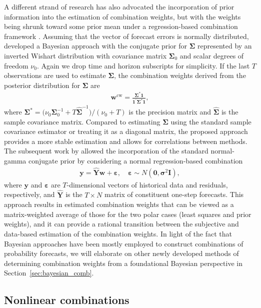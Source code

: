\documentclass[a4paper,11pt]{article}
\begin{document}
A different strand of research has also advocated the incorporation of prior information into the estimation of combination weights, but with the weights being shrunk toward some prior mean under a regression-based combination framework \citep{Newbold2002-wa}. Assuming that the vector of forecast errors is normally distributed, \citet{Clemen1986-pd} developed a Bayesian approach with the conjugate prior for $\bm{\Sigma}$ represented by an inverted Wishart distribution with covariance matrix $\bm{\Sigma}_{0}$ and scalar degrees of freedom $\nu_{0}$. Again we drop time and horizon subscripts for simplicity. If the last $T$ observations are used to estimate $\bm{\Sigma}$, the combination weights derived from the posterior distribution for $\bm{\Sigma}$ are
\begin{align*}
  \bm{w}^{\text{cw}}=\frac{\bm{\Sigma}^{*}\bm{1}}{\bm{1}^{\prime} \bm{\Sigma}^{*} \bm{1}},
\end{align*}
where $\bm{\Sigma}^{*}=\big(\nu_{0} \bm{\Sigma}_{0}^{-1}+T \hat{\bm{\Sigma}}^{-1}\big) /(\nu_{0}+T)$ is the precision matrix and $\hat{\bm{\Sigma}}$ is the sample covariance matrix.
Compared to estimating $\bm{\Sigma}$ using the standard sample covariance estimator or treating it as a diagonal matrix, the proposed approach provides a more stable estimation and allows for correlations between methods. The subsequent work by \citet{Diebold1990-fk} allowed the incorporation of the standard normal-gamma conjugate prior by considering a normal regression-based combination
\begin{align*}
  \bm{y}=\hat{\bm{Y}} \bm{w}+\bm{\varepsilon}, \quad \bm{\varepsilon} \sim N\left(\bm{0}, \bm{\sigma}^{2} \bm{I}\right),
\end{align*}
where $\bm{y}$ and $\bm{\varepsilon}$ are $T$-dimensional vectors of historical data and residuals, respectively, and $\hat{\bm{Y}}$ is the $T \times N$ matrix of constituent one-step forecasts. This approach results in estimated combination weights that can be viewed as a matrix-weighted average of those for the two polar cases (least squares and prior weights), and it can provide a rational transition between the subjective and data-based estimation of the combination weights. In light of the fact that Bayesian approaches have been mostly employed to construct combinations of probability forecasts, we will elaborate on other newly developed methods of determining combination weights from a foundational Bayesian perspective in Section~\ref{sec:bayesian_comb}.

\subsection{Nonlinear combinations}
\label{sec:nonlinear_comb}
\end{document}
